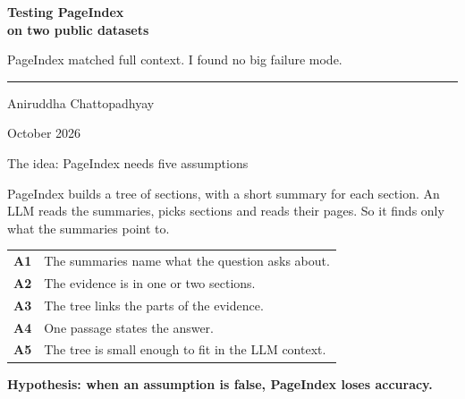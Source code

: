 \documentclass[aspectratio=169,11pt]{beamer}
\newcommand{\callout}[1]{{\fontsize{12}{15.5}\selectfont\color{Ink}\bfseries #1\par}}
\begin{document}
\begin{frame}[plain]
  \vspace{1.25cm}
  {\color{Ink}\fontsize{25}{30}\selectfont\bfseries
    Testing PageIndex\\[0.05cm]
    on two public datasets\par}
  \vspace{0.54cm}
  {\color{Body}\fontsize{13}{17}\selectfont
    PageIndex matched full context. I found no big failure mode.\par}
  \vspace{0.90cm}
  {\color{Rule}\rule{0.42\textwidth}{0.5pt}\par}
  \vspace{0.36cm}
  {\color{Ink}\fontsize{12.5}{16}\selectfont Aniruddha Chattopadhyay\par}
  \vspace{0.12cm}
  {\color{Mute}\fontsize{10.5}{14} October 2026\par}
\end{frame}

\begin{frame}{The idea: PageIndex needs five assumptions}
  \vspace{0.25cm}
  {\fontsize{11}{14.5}\selectfont
  PageIndex builds a tree of sections, with a short summary for each section. An LLM reads the summaries, picks sections and reads their pages. So it finds only what the summaries point to.\par}
  \vspace{0.35cm}
  {\fontsize{11.5}{16}\selectfont
  \begin{tabular}{@{}p{0.9cm}l@{}}
    \textbf{A1} & The summaries name what the question asks about. \\
    \textbf{A2} & The evidence is in one or two sections. \\
    \textbf{A3} & The tree links the parts of the evidence. \\
    \textbf{A4} & One passage states the answer. \\
    \textbf{A5} & The tree is small enough to fit in the LLM context. \\
  \end{tabular}\par}
  \vspace{0.35cm}
  \callout{Hypothesis: when an assumption is false, PageIndex loses accuracy.}
\end{frame}
\end{document}
